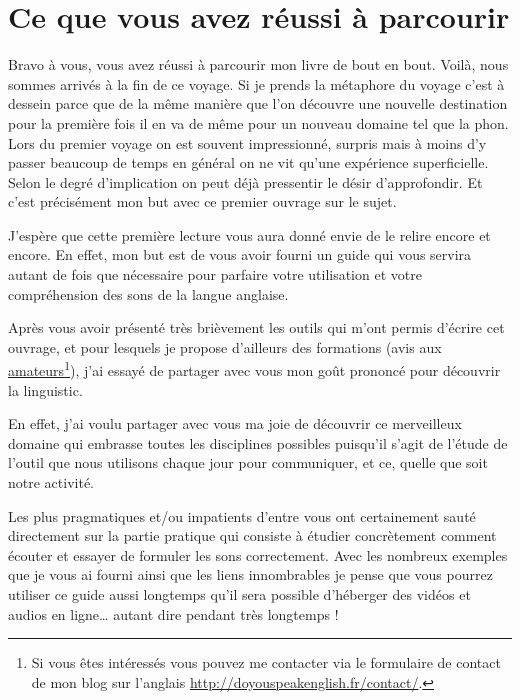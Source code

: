 \chapter{Ce que vous avez réussi à parcourir}\label{chap:success}

Bravo à vous, vous avez réussi à parcourir mon livre de bout en
bout. Voilà, nous sommes arrivés à la fin de ce voyage. Si je prends
la métaphore du voyage c'est à dessein parce que de la même manière
que l'on découvre une nouvelle destination pour la première fois il en
va de même pour un nouveau domaine tel que la \gls{phon}. Lors du
premier voyage on est souvent impressionné, surpris mais à moins d'y
passer beaucoup de temps en général on ne vit qu'une expérience
superficielle. Selon le degré d'implication on peut déjà pressentir le
désir d'approfondir. Et c'est précisément mon but avec ce premier
ouvrage sur le sujet.

J'espère que cette première lecture vous aura donné envie de le relire
encore et encore. En effet, mon but est de vous avoir fourni un guide
qui vous servira autant de fois que nécessaire pour parfaire votre
utilisation et votre compréhension des sons de la langue anglaise.

Après vous avoir présenté très brièvement les outils qui m'ont permis
d'écrire cet ouvrage, et pour lesquels je propose d'ailleurs des
formations (avis aux \href{http://doyouspeakenglish.fr/contact/}{amateurs}\footnote{Si vous êtes intéressés vous
  pouvez me contacter via le formulaire de contact de mon blog sur
  l'anglais \url{http://doyouspeakenglish.fr/contact/}.}), j'ai essayé de partager avec vous mon
goût prononcé pour découvrir la \gls{linguistic}.

En effet, j'ai voulu partager avec vous ma joie de découvrir ce
merveilleux domaine qui embrasse toutes les disciplines possibles
puisqu'il s'agit de l'étude de l'outil que nous utilisons chaque jour
pour communiquer, et ce, quelle que soit notre activité.

Les plus pragmatiques et/ou impatients d'entre vous ont certainement
sauté directement sur la partie pratique qui consiste à étudier
concrètement comment écouter et essayer de formuler les sons
correctement. Avec les nombreux exemples que je vous ai fourni ainsi
que les liens innombrables je pense que vous pourrez utiliser ce guide
aussi longtemps qu'il sera possible d'héberger des vidéos et audios en
ligne\dots{} autant dire pendant très longtemps !

